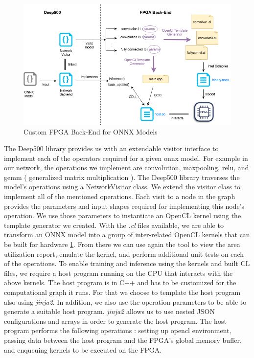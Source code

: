 \begin{figure}[h!]
\centering
\includegraphics[width=1.0\textwidth]{Figures/integration}
\decoRule
\caption[Intergration with Deep500 Diagram]{ Custom FPGA Back-End for ONNX Models }
\label{fig:integration}
\end{figure}

The Deep500 library provides us with an extendable visitor interface to implement each of the operators required for a given onnx model. For example in our network, the operations we implement are convolution, maxpooling, relu, and gemm ( generalized matrix multiplication ). The Deep500 library traverses the model’s operations using a NetworkVisitor class. We extend the visitor class to implement all of the mentioned operations. Each visit to a node in the graph provides the parameters and input shapes required for implementing this node's operation. We use those parameters to instantiate an OpenCL kernel using the template generator we created. With the \emph{.cl} files available, we are able to transform an ONNX model into a group of inter-related OpenCL kernels that can be built for hardware \ref{fig:integration}. From there we can use again the tool to view the area utilization report, emulate the kernel, and perform additional unit tests on each of the operations.
To enable training and inference using the kernels and built CL files, we require a host program running on the CPU that interacts with the above kernels. The host program is in C++ and has to be customized for the computational graph it runs. For that we choose to template the host program also using  \emph{jinja2}. In addition, we also use the operation parameters to be able to generate a suitable host program.  
\emph{jinja2} allows us to use nested JSON configurations and arrays in order to generate the host program. The host program performs the following operations : setting up opencl environment, passing data between the host program and the FPGA's global memory buffer, and enqueuing kernels to be executed on the FPGA.

